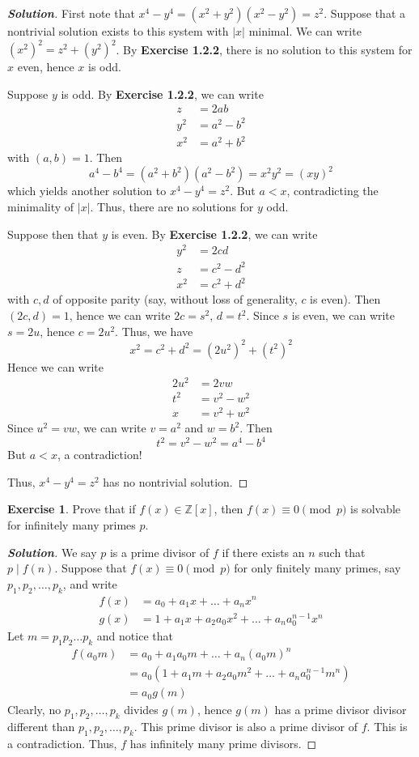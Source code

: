 \documentclass[12pt,leqno]{book}
\numberwithin{equation}{section}
\theoremstyle{definition}
\newtheorem{exer}[thm]{Exercise}
\newenvironment{Solution}{\begin{proof}[\textnormal{\textbf{Solution}}]}{\end{proof}}
\begin{document}
\begin{Solution}
 First note that $x^4-y^4=(x^2+y^2)(x^2-y^2)=z^2$. Suppose that a nontrivial solution exists to this system with $|x|$ minimal. We can write $(x^2)^2=z^2+(y^2)^2$. By \textbf{Exercise 1.2.2}, there is no solution to this system for $x$ even, hence $x$ is odd. 

Suppose $y$ is odd. By \textbf{Exercise 1.2.2}, we can write \begin{align*}z&=2ab\\y^2&=a^2-b^2\\x^2&=a^2+b^2\end{align*} with $(a,b)=1$. Then \[a^4-b^4=(a^2+b^2)(a^2-b^2)=x^2y^2=(xy)^2\] which yields another solution to $x^4-y^4=z^2$. But $a<x$, contradicting the minimality of $|x|$. Thus, there are no solutions for $y$ odd.

Suppose then that $y$ is even. By \textbf{Exercise 1.2.2}, we can write \begin{align*}y^2&=2cd\\z&=c^2-d^2\\x^2&=c^2+d^2\end{align*} with $c,d$ of opposite parity (say, without loss of generality, $c$ is even). Then $(2c,d)=1$, hence we can write $2c=s^2$, $d=t^2$. Since $s$ is even, we can write $s=2u$, hence $c=2u^2$. Thus, we have \[x^2=c^2+d^2=(2u^2)^2+(t^2)^2\] Hence we can write \begin{align*}2u^2&=2vw\\t^2&=v^2-w^2\\x&=v^2+w^2\end{align*} Since $u^2=vw$, we can write $v=a^2$ and $w=b^2$. Then \[t^2=v^2-w^2=a^4-b^4\] But $a<x$, a contradiction! 

Thus, $x^4-y^4=z^2$ has no nontrivial solution.
\end{Solution}

\begin{exer}
 Prove that if $f(x)\in\mathbb{Z}[x]$, then $f(x)\equiv0\pmod{p}$ is solvable for infinitely many primes $p$.
\end{exer}

\begin{Solution}
 We say $p$ is a prime divisor of $f$ if there exists an $n$ such that $p\mid f(n)$. Suppose that $f(x)\equiv0\pmod{p}$ for only finitely many primes, say $p_1,p_2,\hdots,p_k$, and write \begin{align*}f(x)&=a_0+a_1x+\hdots+a_nx^n\\g(x)&=1+a_1x+a_2a_0x^2+\hdots+a_na_0^{n-1}x^n\end{align*} Let $m=p_1p_2\hdots p_k$ and notice that \begin{align*}f(a_0m)&=a_0+a_1a_0m+\hdots+a_n(a_0m)^n\\&=a_0(1+a_1m+a_2a_0m^2+\hdots+a_na_0^{n-1}m^n)\\&=a_0g(m)\end{align*} Clearly, no $p_1,p_2,\hdots,p_k$ divides $g(m)$, hence $g(m)$ has a prime divisor divisor different than $p_1,p_2,\hdots,p_k$. This prime divisor is also a prime divisor of $f$. This is a contradiction. Thus, $f$ has infinitely many prime divisors.
\end{Solution}
\end{document}
